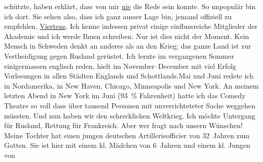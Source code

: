 {\begin{ledgroupsized}[t]{13cm}
                    schützte, haben erklärt, dass von mir \uline{nie} die
                    Rede sein konnte. So unpopulär bin ich dort. Sie sehen also, dass ich ganz
                    ausser Lage bin, jemand offiziell zu empfehlen.\pend
           \pstart
           \uline{Viertens}. Ich kenne indessen privat einige
                    einflussreiche Mitglieder der Akademie und ich werde Ihnen schreiben.\pend
           \pstart
           Nur ist dies nicht der Moment. Kein Mensch in Schweden denkt an anderes als an den Krieg; das ganze Land ist zur
                    Vertheidigung gegen Rusland gerüstet.\pend
           \pstart
           {\pb}Ich lernte im vergangenen
                    Sommer einigermassen englisch reden, hielt im
                        November–December mit viel Erfolg Vorlesungen in
                    allen Städten Englands und Schottlands.\hspace*{2em}Mai und Juni redete ich in Nordamerika, in New Haven, Chicago, Minneapolis und New York. An meinem
                    letzten Abend in New York im
                        Juni (93 {\%} Fahrenheit) hatte ich das
                        Comedy Theatre so voll dass über tausend
                    Personen mit unverrichteteter Sache weggehen müssten.\pend
           \pstart
           Und nun haben wir den schrecklichen Weltkrieg. Ich möchte Untergang für Rusland, Rettung für Frankreich. Aber wer fragt nach unsern Wünschen! Meine Tochter hat einen jungen
                    deutschen Artillerieofficier von 32 Jahren zum Gatten. Sie ist hier mit einem
                    kl. Mädchen von 6 Jahren
                    und einem kl. Jungen von

\end{ledgroupsized}}
